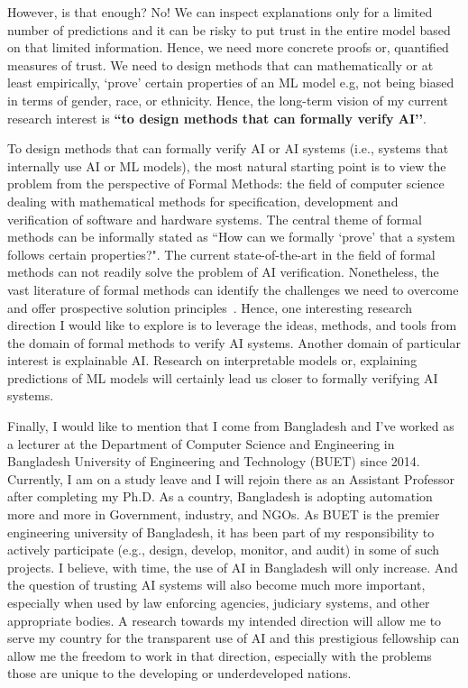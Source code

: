 \documentclass[12pt]{article}
\begin{document}
However, is that enough? No! We can inspect explanations only for a limited number of predictions and it can be risky to put trust in the entire model based on that limited information. Hence, we need more concrete proofs or, quantified measures of trust. We need to design methods that can mathematically or at least empirically, ‘prove’ certain properties of an ML model e.g, not being biased in terms of gender, race, or ethnicity. Hence, the long-term vision of my current research interest is \textbf{``to design methods that can formally verify AI’'}. 

To design methods that can formally verify AI or AI systems (i.e., systems that internally use AI or ML models), the most natural starting point is to view the problem from the perspective of Formal Methods: the field of computer science dealing with mathematical methods for specification, development and verification of software and hardware systems. The central theme of formal methods can be informally stated as ``How can we formally `prove' that a system follows certain properties?". The current state-of-the-art in the field of formal methods can not readily solve the problem of AI verification. Nonetheless, the vast literature of formal methods can identify the challenges we need to overcome and offer prospective solution principles~\cite{verifiedAI}. Hence, one interesting research direction I would like to explore is to leverage the ideas, methods, and tools from the domain of formal methods to verify AI systems.  Another domain of particular interest is explainable AI. Research on interpretable models or, explaining predictions of ML models will certainly lead us closer to formally verifying AI systems.


Finally, I would like to mention that I come from Bangladesh and I’ve worked as a lecturer at the Department of Computer Science and Engineering in Bangladesh University of Engineering and Technology (BUET) since 2014. Currently, I am on a study leave and I will rejoin there as an Assistant Professor after completing my Ph.D. As a country, Bangladesh is adopting  automation more and more in Government, industry, and NGOs. As BUET is the premier engineering university of Bangladesh, it has been part of my responsibility to actively participate (e.g., design, develop, monitor, and audit) in some of such projects. I believe, with time, the use of AI in Bangladesh will only increase. And the question of trusting AI systems will also become much more important, especially when used by law enforcing agencies, judiciary systems, and other appropriate bodies. A research towards my intended direction will allow me to serve my country for the transparent use of AI and this prestigious fellowship can allow me the freedom to work in that direction, especially with the problems those are unique to the developing or underdeveloped nations. 

 

\end{document}
